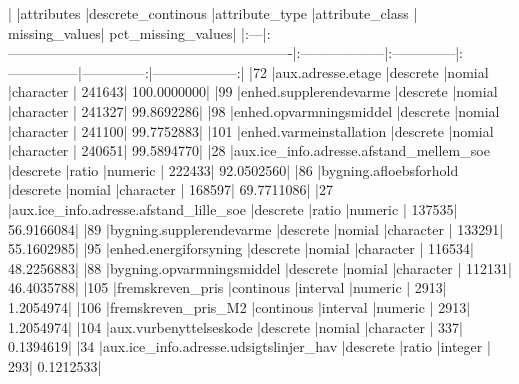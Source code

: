 \documentclass{report}
\begin{document}
\begin{Schunk}
\begin{Soutput}
|    |attributes                                                    |descrete_continous |attribute_type |attribute_class | missing_values| pct_missing_values|
|:---|:-------------------------------------------------------------|:------------------|:--------------|:---------------|--------------:|------------------:|
|72  |aux.adresse.etage                                             |descrete           |nomial         |character       |         241643|        100.0000000|
|99  |enhed.supplerendevarme                                        |descrete           |nomial         |character       |         241327|         99.8692286|
|98  |enhed.opvarmningsmiddel                                       |descrete           |nomial         |character       |         241100|         99.7752883|
|101 |enhed.varmeinstallation                                       |descrete           |nomial         |character       |         240651|         99.5894770|
|28  |aux.ice_info.adresse.afstand_mellem_soe                       |descrete           |ratio          |numeric         |         222433|         92.0502560|
|86  |bygning.afloebsforhold                                        |descrete           |nomial         |character       |         168597|         69.7711086|
|27  |aux.ice_info.adresse.afstand_lille_soe                        |descrete           |ratio          |numeric         |         137535|         56.9166084|
|89  |bygning.supplerendevarme                                      |descrete           |nomial         |character       |         133291|         55.1602985|
|95  |enhed.energiforsyning                                         |descrete           |nomial         |character       |         116534|         48.2256883|
|88  |bygning.opvarmningsmiddel                                     |descrete           |nomial         |character       |         112131|         46.4035788|
|105 |fremskreven_pris                                              |continous          |interval       |numeric         |           2913|          1.2054974|
|106 |fremskreven_pris_M2                                           |continous          |interval       |numeric         |           2913|          1.2054974|
|104 |aux.vurbenyttelseskode                                        |descrete           |nomial         |character       |            337|          0.1394619|
|34  |aux.ice_info.adresse.udsigtslinjer_hav                        |descrete           |ratio          |integer         |            293|          0.1212533|

\end{Soutput}
\end{Schunk}
\end{document}
